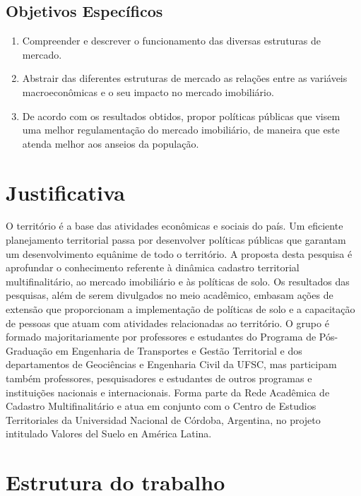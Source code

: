 \documentclass[
	12pt,				%
	oneside,			%
	a4paper,			%
	chapter=TITLE,		%
	section=TITLE,		%
	english,			%
	brazil				%
	]{abntex2}
\begin{document}
\subsection{Objetivos Específicos}\label{objetivos-especuxedficos}
\begin{enumerate}
\def\labelenumi{\arabic{enumi}.}
\tightlist
\item
  Compreender e descrever o funcionamento das diversas estruturas de
  mercado.
\item
  Abstrair das diferentes estruturas de mercado as relações entre as
  variáveis macroeconômicas e o seu impacto no mercado imobiliário.
\item
  De acordo com os resultados obtidos, propor políticas públicas que
  visem uma melhor regulamentação do mercado imobiliário, de maneira que
  este atenda melhor aos anseios da população.
\end{enumerate}
\section{Justificativa}\label{justificativa}

O território é a base das atividades econômicas e sociais do país. Um
eficiente planejamento territorial passa por desenvolver políticas
públicas que garantam um desenvolvimento equânime de todo o território.
A proposta desta pesquisa é aprofundar o conhecimento referente à
dinâmica cadastro territorial multifinalitário, ao mercado imobiliário e
às políticas de solo. Os resultados das pesquisas, além de serem
divulgados no meio acadêmico, embasam ações de extensão que proporcionam
a implementação de políticas de solo e a capacitação de pessoas que
atuam com atividades relacionadas ao território. O grupo é formado
majoritariamente por professores e estudantes do Programa de
Pós-Graduação em Engenharia de Transportes e Gestão Territorial e dos
departamentos de Geociências e Engenharia Civil da UFSC, mas participam
também professores, pesquisadores e estudantes de outros programas e
instituições nacionais e internacionais. Forma parte da Rede Acadêmica
de Cadastro Multifinalitário e atua em conjunto com o Centro de Estudios
Territoriales da Universidad Nacional de Córdoba, Argentina, no projeto
intitulado Valores del Suelo en América Latina.

\section{Estrutura do trabalho}\label{estrutura-do-trabalho}
\end{document}
